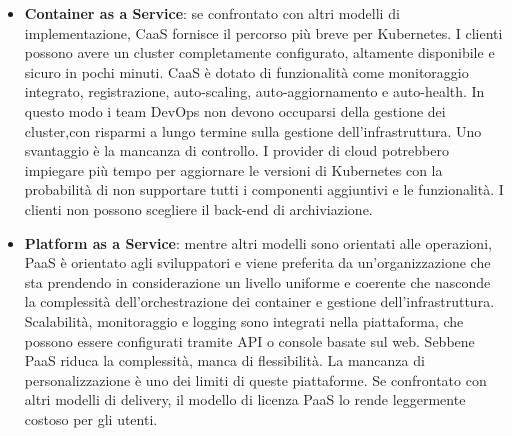 \documentclass[12pt, a4paper]{report}
\begin{document}
\begin{itemize}
  \item \textbf{Container as a Service}: se confrontato con altri modelli di implementazione, CaaS fornisce il percorso più breve per Kubernetes. I clienti possono avere un cluster completamente configurato, altamente disponibile e sicuro in pochi minuti. CaaS è dotato di funzionalità come monitoraggio integrato, registrazione, auto-scaling, auto-aggiornamento e auto-health. In questo modo i team DevOps non devono occuparsi della gestione dei cluster,con risparmi a lungo termine sulla gestione dell'infrastruttura. Uno svantaggio è la mancanza di controllo. I provider di cloud potrebbero impiegare più tempo per aggiornare le versioni di Kubernetes con la probabilità di non supportare tutti i componenti aggiuntivi e le funzionalità. I clienti non possono scegliere il back-end di archiviazione.
  \item \textbf{Platform as a Service}: mentre altri modelli sono orientati alle operazioni, PaaS è orientato agli sviluppatori e viene preferita da un'organizzazione che sta prendendo in considerazione un livello uniforme e coerente che nasconde la complessità dell'orchestrazione dei container e gestione dell'infrastruttura. Scalabilità, monitoraggio e logging sono integrati nella piattaforma, che possono essere configurati tramite API o console basate sul web. Sebbene PaaS riduca la complessità, manca di flessibilità. La mancanza di personalizzazione è uno dei limiti di queste piattaforme. Se confrontato con altri modelli di delivery, il modello di licenza PaaS lo rende leggermente costoso per gli utenti.

\end{itemize}
\newpage
\end{document}
